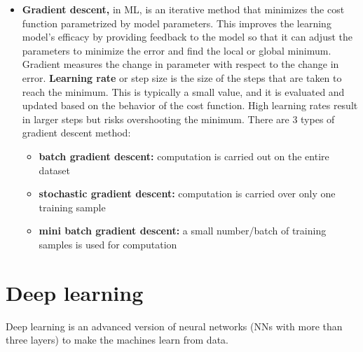 \documentclass[
  letterpaper,
]{book}
\providecommand{\tightlist}{%
  \setlength{\itemsep}{0pt}\setlength{\parskip}{0pt}}\usepackage{longtable,booktabs,array}
\begin{document}
\begin{itemize}
\tightlist
\item
  \textbf{Gradient descent,} in ML, is an iterative method that
  minimizes the cost function parametrized by model parameters. This
  improves the learning model's efficacy by providing feedback to the
  model so that it can adjust the parameters to minimize the error and
  find the local or global minimum. Gradient measures the change in
  parameter with respect to the change in error. \textbf{Learning rate}
  or step size is the size of the steps that are taken to reach the
  minimum. This is typically a small value, and it is evaluated and
  updated based on the behavior of the cost function. High learning
  rates result in larger steps but risks overshooting the minimum. There
  are 3 types of gradient descent method:

  \begin{itemize}
  \tightlist
  \item
    \textbf{batch gradient descent:} computation is carried out on the
    entire dataset
  \item
    \textbf{stochastic gradient descent:} computation is carried over
    only one training sample
  \item
    \textbf{mini batch gradient descent:} a small number/batch of
    training samples is used for computation
  \end{itemize}
\end{itemize}

\hypertarget{deep-learning}{%
\section{Deep learning}\label{deep-learning}}

Deep learning is an advanced version of neural networks (NNs with more
than three layers) to make the machines learn from data.
\end{document}
